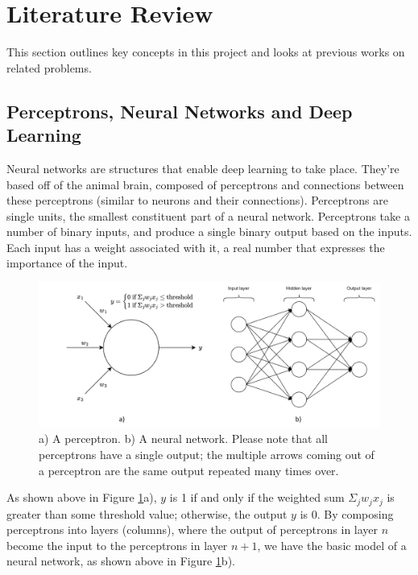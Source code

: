 \documentclass[a4paper, oneside, 11pt]{article}
\begin{document}
\section{Literature Review}

This section outlines key concepts in this project and looks at previous works on related problems.

\subsection{Perceptrons, Neural Networks and Deep Learning}

Neural networks are structures that enable deep learning to take place. They're based off of the animal brain, composed of perceptrons and connections between these perceptrons (similar to neurons and their connections). Perceptrons are single units, the smallest constituent part of a neural network. Perceptrons take a number of binary inputs, and produce a single binary output based on the inputs. Each input has a weight associated with it, a real number that expresses the importance of the input.

\begin{figure}[ht]
    \centering
    \includegraphics[scale = 0.5]{img/neurals combined.png}
    \caption{a) A perceptron. b) A neural network. Please note that all perceptrons have a single output; the multiple arrows coming out of a perceptron are the same output repeated many times over.}
    \label{fig:unifiedneural}
\end{figure}

As shown above in Figure \ref{fig:unifiedneural}a), $y$ is 1 if and only if the weighted sum $\Sigma_jw_jx_j$ is greater than some threshold value; otherwise, the output $y$ is 0. By composing perceptrons into layers (columns), where the output of perceptrons in layer $n$ become the input to the perceptrons in layer $n + 1$, we have the basic model of a neural network, as shown above in Figure \ref{fig:unifiedneural}b).
\end{document}
